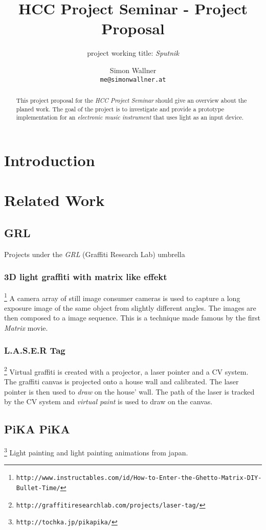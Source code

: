 \documentclass[10pt,a4paper]{scrartcl}
\author{Simon Wallner\\\texttt{me@simonwallner.at}}
\title{HCC Project Seminar - Project Proposal}
\subtitle{project working title: \emph{Sputnik}}
\begin{document}
\maketitle

\begin{abstract}
This project proposal for the \emph{HCC Project Seminar} should give an overview about the planed work. The goal of the project is to investigate and provide a prototype implementation for an \emph{electronic music instrument} that uses light as an input device.
\end{abstract}

\section{Introduction}

\section{Related Work}
\subsection{GRL}
Projects under the \emph{GRL} (Graffiti Research Lab) umbrella
\subsubsection{3D light graffiti with matrix like effekt}
\footnote{\texttt{http://www.instructables.com/id/How-to-Enter-the-Ghetto-Matrix-DIY-Bullet-Time/}} A camera array of still image consumer cameras is used to capture a long exposure image of the same object from slightly different angles. The images are then composed to a image sequence. This is a technique made famous by the first \emph{Matrix} movie.

\subsubsection{L.A.S.E.R Tag}
\footnote{\texttt{http://graffitiresearchlab.com/projects/laser-tag/}} Virtual graffiti is created with a projector, a laser pointer and a CV system. The graffiti canvas is projected onto a house wall and calibrated. The laser pointer is then used to \emph{draw} on the house' wall. The path of the laser is tracked by the CV system and \emph{virtual paint} is used to draw on the canvas.

\subsection{PiKA PiKA}
\footnote{\texttt{http://tochka.jp/pikapika/}} Light painting and light painting animations from japan.
\end{document}
